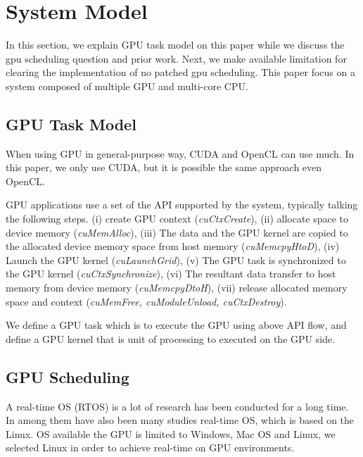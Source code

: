 \section{System Model}\label{sec:system_model}
In this section, we explain GPU task model on this paper while we discuss the gpu scheduling question and prior work.
Next, we make available limitation for clearing the implementation of no patched gpu scheduling.
This paper focus on a system composed of multiple GPU and multi-core CPU.

\subsection{GPU Task Model}
When using GPU in general-purpose way, CUDA and OpenCL can use much.
In this paper, we only use CUDA, but it is possible the same approach even OpenCL.

GPU applications use a set of the API supported by the system,
typically talking the following steps.
(i) create GPU context (\textit{cuCtxCreate}), 
(ii) allocate space to device memory (\textit{cuMemAlloc}), 
(iii) The data and the GPU kernel are copied to the allocated device memory space from host memory (\textit{cuMemcpyHtoD}), 
(iv) Launch the GPU kernel (\textit{cuLaunchGrid}), 
(v) The GPU task is synchronized to the GPU kernel (\textit{cuCtxSynchronize}), 
(vi) The resultant data transfer to host memory from device memory (\textit{cuMemcpyDtoH}), 
(vii) release allocated memory space and context (\textit{cuMemFree, cuModuleUnload, cuCtxDestroy}).

We define a GPU task which is to execute the GPU using above API flow,
and define a GPU kernel that is unit of processing to executed on the GPU side.


\subsection{GPU Scheduling}
A real-time OS (RTOS) is a lot of research\cite{spring, redline,itron,rk} has been conducted for a long time.
In among them have also been many studies\cite{prk,rtai,yodaiken1999rtlinux,litmus,kato2009loadable} real-time OS, which is based on the Linux.
OS available the GPU is limited to Windows, Mac OS and Linux,
we selected Linux in order to achieve real-time on GPU environments.

